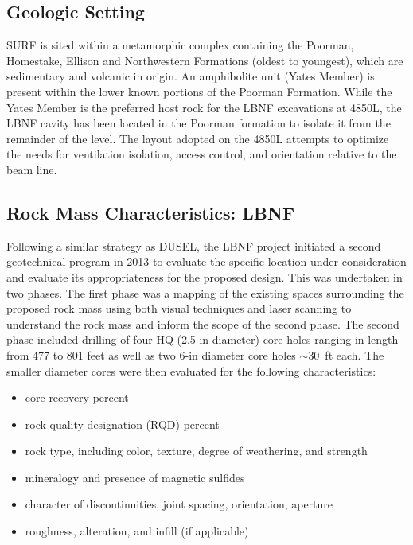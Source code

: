 \subsection{Geologic Setting}
\label{sec:fscf-site-cond-geo-set}

SURF is sited within a metamorphic complex containing the Poorman, Homestake, Ellison and Northwestern Formations (oldest to youngest), which are sedimentary and volcanic in origin. An amphibolite unit (Yates Member) is present within the lower known portions of the Poorman Formation. While the Yates Member is the preferred host rock for the LBNF excavations at 4850L, the LBNF cavity has been located in the Poorman formation to isolate it from the remainder of the level. The layout adopted on the 4850L attempts to optimize the needs for ventilation isolation, access control, and orientation relative to the beam line.

\subsection{Rock Mass Characteristics: LBNF}
\label{sec:fscf-site-cond-geo-rock}

Following a similar strategy as DUSEL, the LBNF project initiated a second geotechnical program in 2013 to evaluate the specific location under consideration and evaluate its appropriateness for the proposed design.  This was undertaken in two phases.  The first phase was a mapping of the existing spaces surrounding the proposed rock mass using both visual techniques and laser scanning to understand the rock mass and inform the scope of the second phase.  The second phase included drilling of four HQ (2.5-in diameter) core holes ranging in length from 477 to 801 feet as well as two 6-in diameter core holes $\sim$30~ft each.  The smaller diameter cores were then evaluated for the following characteristics:

\begin{itemize}
 \item core recovery percent
 \item rock quality designation (RQD) percent
 \item rock type, including color, texture, degree of weathering, and strength
 \item mineralogy and presence of magnetic sulfides
 \item character of discontinuities, joint spacing, orientation, aperture
 \item roughness, alteration, and infill (if applicable)
\end{itemize}

